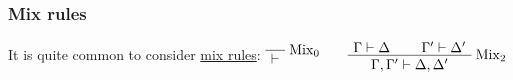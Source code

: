 \subsubsection{Mix rules}\label{mix-rules}

It is quite common to consider \href{Mix}{mix rules}:
\(\LabelRule{\rulename{Mix}_0}
\NulRule{\vdash}
\DisplayProof
\qquad
\AxRule{\Gamma \vdash \Delta}
\AxRule{\Gamma' \vdash \Delta'}
\LabelRule{\rulename{Mix}_2}
\BinRule{\Gamma,\Gamma' \vdash \Delta,\Delta'}
\DisplayProof\)


